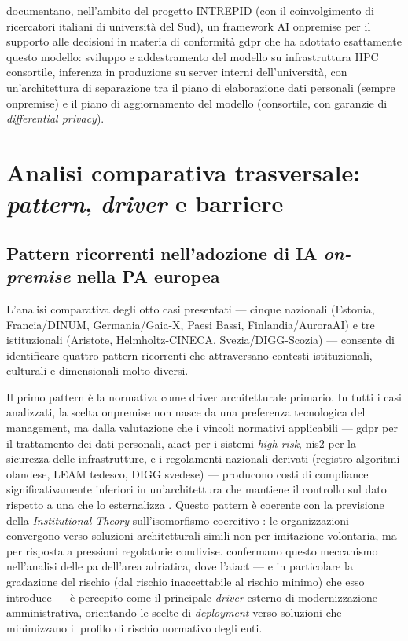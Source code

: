 \textcite{LoreBasile2023} documentano, nell'ambito del progetto INTREPID
(con il coinvolgimento di ricercatori italiani di università del Sud), un framework
AI \gls{onpremise} per il supporto alle decisioni in materia di conformità \gls{gdpr}
che ha adottato esattamente questo modello: sviluppo e addestramento del modello su
infrastruttura HPC consortile, inferenza in produzione su server interni
dell'università, con un'architettura di separazione tra il piano di elaborazione
dati personali (sempre \gls{onpremise}) e il piano di aggiornamento del modello
(consortile, con garanzie di \textit{differential privacy}).

\section{Analisi comparativa trasversale: \textit{pattern}, \textit{driver} e barriere}
\label{sec:analisi-comparativa}

\subsection{Pattern ricorrenti nell'adozione di IA \textit{on-premise} nella PA europea}

L'analisi comparativa degli otto casi presentati --- cinque nazionali (Estonia,
Francia/DINUM, Germania/Gaia-X, Paesi Bassi, Finlandia/AuroraAI) e tre
istituzionali (Aristote, Helmholtz-CINECA, Svezia/DIGG-Scozia) ---
consente di identificare quattro pattern ricorrenti che attraversano contesti
istituzionali, culturali e dimensionali molto diversi.

Il primo pattern è la normativa come driver architetturale primario.
In tutti i casi analizzati, la scelta \gls{onpremise} non nasce da una preferenza
tecnologica del management, ma dalla valutazione che i vincoli normativi applicabili
--- \gls{gdpr} per il trattamento dei dati personali, \gls{aiact} per i sistemi \textit{high-risk},
\gls{nis2} per la sicurezza delle infrastrutture, e i regolamenti nazionali derivati (registro
algoritmi olandese, LEAM tedesco, DIGG svedese) --- producono costi di compliance
significativamente inferiori in un'architettura che mantiene il controllo sul dato
rispetto a una che lo esternalizza \parencite{Haynes2026}. Questo pattern è coerente
con la previsione della \textit{Institutional Theory} sull'isomorfismo
coercitivo \parencite{DiMaggioPow1983}: le organizzazioni convergono
verso soluzioni architetturali simili non per imitazione volontaria, ma per risposta
a pressioni regolatorie condivise. \textcite{KlaricBoban2025AIPAmod} confermano
questo meccanismo nell'analisi delle \gls{pa} dell'area adriatica, dove l'\gls{aiact} ---
e in particolare la gradazione del rischio (dal rischio inaccettabile al rischio
minimo) che esso introduce --- è percepito come il principale \textit{driver}
esterno di modernizzazione amministrativa, orientando le scelte di
\textit{deployment} verso soluzioni che minimizzano il profilo di rischio
normativo degli enti.

